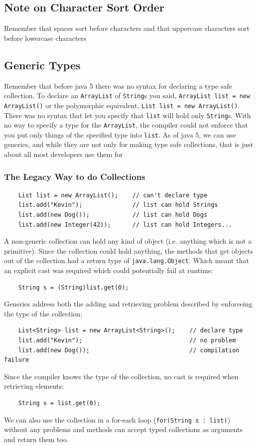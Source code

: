 \subsection{Note on Character Sort Order}
Remember that spaces sort before characters and that uppercase characters sort 
before lowercase characters

\subsection{Generic Types}
Remember that before java 5 there was no syntax for declaring a type safe 
collection. To declare an \verb#ArrayList# of \verb#String#s you said, 
\verb#ArrayList list = new ArrayList()# or the polymorphic equivalent, 
\verb#List list = new ArrayList()#. There was no syntax that let you specify 
that \verb#list# will hold only \verb#String#s. With no way to specify a type 
for the \verb#ArrayList#, the compiler could not enforce that you put only 
things of the specified type into \verb#list#. As of java 5, we can use 
generics, and while they are not only for making type safe collections, that is 
just about all most developers use them for

\subsubsection{The Legacy Way to do Collections}
\begin{verbatim}
    List list = new ArrayList();    // can't declare type
    list.add("Kevin");              // list can hold Strings
    list.add(new Dog());            // list can hold Dogs
    list.add(new Integer(42));      // list can hold Integers...
\end{verbatim}
A non-generic collection can hold any kind of object (i.e. anything which is 
not a primitive). Since the collection could hold anything, the methods that 
get objects out of the collection had a return type of \verb#java.lang.Object#.  
Which meant that an explicit cast was required which could potentially fail at 
runtime:
\begin{verbatim}
    String s = (String)list.get(0);
\end{verbatim}
Generics address both the adding and retrieving problem described by enforceing 
the type of the collection:
\begin{verbatim}
    List<String> list = new ArrayList<String>();    // declare type
    list.add("Kevin");                              // no problem
    list.add(new Dog());                            // compilation failure
\end{verbatim}
Since the compiler knows the type of the collection, no cast is required when 
retrieving elements:
\begin{verbatim}
    String s = list.get(0);
\end{verbatim}
We can also use the collection in a for-each loop (\verb#for(String s : list)#) 
without any problems and methods can accept typed collections as arguments and 
return them too.

